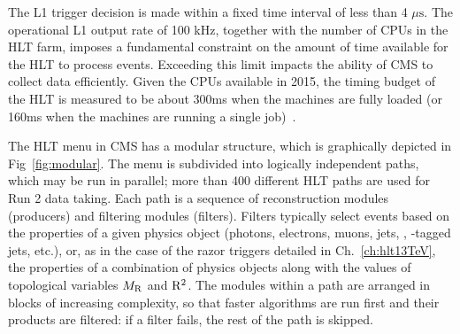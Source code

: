 The L1 trigger decision is made within a fixed time
interval of less than 4 $\mu\mathrm{s}$. The operational L1 output
rate of 100 \unit{kHz}, together with the number of CPUs in the HLT
farm, imposes a fundamental constraint on the amount of time available for the HLT to process events.
Exceeding this limit impacts the ability of CMS to collect data
efficiently. Given the CPUs available in 2015, the timing budget of the HLT is
measured to be about 300\unit{ms} when the machines are fully loaded
(or 160\unit{ms} when the machines are running a single
job)~\cite{Richardson:2015zdg}.

The HLT menu in CMS has a modular structure, which is graphically depicted in Fig~\ref{fig:modular}.
The menu is subdivided into logically independent paths, which may be
run in parallel; more than 400 different HLT paths are used for Run 2
data taking. Each path is a sequence of
reconstruction modules (producers) and filtering modules
(filters). Filters typically select events based on the properties of a given physics object (photons, electrons,
muons, jets, \ptvecmiss, \PQb-tagged jets, etc.), or, as in the case of the razor triggers
detailed in Ch.~\ref{ch:hlt13TeV}, the properties of a combination of physics objects
along with the values of topological variables $M_\mathrm{R}$ and  $\mathrm{R}^2$. The modules
within a path are arranged in blocks of increasing complexity, so that faster
algorithms are run first and their products are filtered: if a filter fails, the rest of the path is
skipped. 


